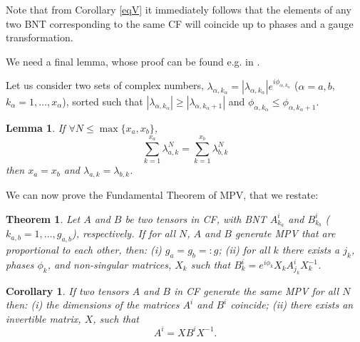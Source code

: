 \documentclass{elsarticle}
\newcommand{\be}{\begin{equation}}
\newcommand{\ee}{\end{equation}}
\newtheorem*{thm*}{Theorem}
\newtheorem*{cor*}{Corollary}
\newtheorem{lem}[thm]{Lemma}
\begin{document}
Note that from Corollary \ref{eqV} it immediately follows that the elements of any two BNT corresponding to the same CF will coincide up to phases and a gauge transformation.

We need a final lemma, whose proof can be found e.g. in \cite{Gemma}.

Let us consider two sets of complex numbers, $\lambda_{\alpha,k_\alpha}=|\lambda_{\alpha,k_\alpha}|e ^{i \phi_{\alpha,k_\alpha}}$ ($\alpha=a,b$, $k_\alpha=1,\ldots,x_\alpha$), sorted such that $|\lambda_{\alpha,k_\alpha}|\ge |\lambda_{\alpha,k_\alpha+1}|$ and
$\phi_{\alpha,k_\alpha}\le \phi_{\alpha,k_\alpha+1}$.

\begin{lem}
    \label{Lem:app_simple}
    If $\forall N\le \max\{x_a,x_b\}$,
    \be
        \label{eq:app_aux}
        \sum_{k=1}^{x_a} \lambda_{a,k}^N = \sum_{k=1}^{x_b} \lambda_{b,k}^N
    \ee
    then  $x_a=x_b$ and $\lambda_{a,k}=\lambda_{b,k}$.
\end{lem}

We can now prove the Fundamental Theorem of MPV, that we restate:

\begin{thm*}
    \label{thm1}
    Let $A$ and $B$ be two tensors in CF, with BNT $A^i_{k_a}$ and $B^i_{k_b}$ ($k_{a,b}=1,\dots,g_{a,b}$), respectively. If for all $N$, $A$ and $B$ generate MPV that are proportional to each other, then: (i) $g_a=g_b=:g$; (ii) for all $k$ there exists a $j_k$, phases $\phi_{k}$, and non-singular matrices, $X_{k}$ such that $B^i_{k}=e^{i\phi_{k}}X_{k}A^i_{j_k}X_{k}^{-1}$.
\end{thm*}

\begin{cor*}
    \label{II_cor2}
    If two tensors $A$ and $B$ in CF generate the same MPV for all $N$ then: (i) the dimensions of the matrices $A^i$ and $B^i$ coincide; (ii) there exists an invertible matrix, $X$, such that
    \be
        \label{eq:II_auxcor}
        A^i = X B^i X^{-1}.
    \ee
\end{cor*}
\end{document}
